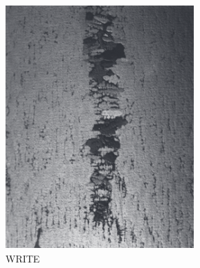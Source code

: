 \begin{figure}[b!] 
\centering
  \begin{subfigure}[t]{0.2\textwidth}
    \centering
	\includegraphics[width=\textwidth]{Chapter0/Graphics/freckle1.png}
	\caption{WRITE}
    \label{fig:freckle1}
  \end{subfigure}
   \hspace{2cm}
   \begin{subfigure}[t]{0.2\textwidth}
    \centering

\end{subfigure}
\end{figure}
